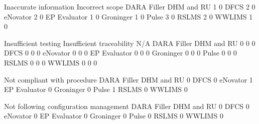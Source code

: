 \documentclass{article}
\begin{document}
\begin{Schunk}
\begin{Soutput}
                         Inaccurate information Incorrect scope
  DARA Filler DHM and RU                      1               0
  DFCS                                        2               0
  eNovator                                    2               0
  EP Evaluator                                1               0
  Groninger                                   1               0
  Pulse                                       3               0
  RSLMS                                       2               0
  WWLIMS                                      1               0
                        
                         Insufficient testing Insufficient traceability N/A
  DARA Filler DHM and RU                    0                         0   0
  DFCS                                      0                         0   0
  eNovator                                  0                         0   0
  EP Evaluator                              0                         0   0
  Groninger                                 0                         0   0
  Pulse                                     0                         0   0
  RSLMS                                     0                         0   0
  WWLIMS                                    0                         0   0
                        
                         Not compliant with procedure
  DARA Filler DHM and RU                            0
  DFCS                                              0
  eNovator                                          1
  EP Evaluator                                      0
  Groninger                                         0
  Pulse                                             1
  RSLMS                                             0
  WWLIMS                                            0
                        
                         Not following configuration management
  DARA Filler DHM and RU                                      0
  DFCS                                                        0
  eNovator                                                    0
  EP Evaluator                                                0
  Groninger                                                   0
  Pulse                                                       0
  RSLMS                                                       0
  WWLIMS                                                      0
                        

\end{Soutput}
\end{Schunk}
\end{document}
